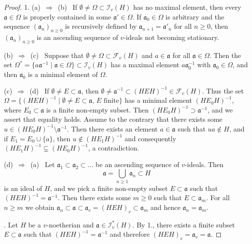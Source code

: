 \documentclass[a4paper]{amsart}
\theoremstyle{definition}
\numberwithin{equation}{section}
\begin{document}
\begin{proof}
1. (a)\, $\Rightarrow$\, (b) \ If $\emptyset \ne \Omega \subset
\mathcal I_v(H)$ has no maximal element, then every $\mathfrak a \in
\Omega$ is properly contained in some $\mathfrak a' \in \Omega$. If
$\mathfrak a_0 \in \Omega$ is arbitrary and the sequence $(\mathfrak
a_n)_{n \ge 0}$ is recursively defined by $\mathfrak a_{n+1} =
\mathfrak a'_n$ for all $n\ge 0$, then $(\mathfrak a_n)_{n\ge 0}$ is
an ascending sequence of $v$-ideals not becoming stationary.

\smallskip

(b)\, $\Rightarrow$\, (c) \ Suppose that $\emptyset \ne \Omega
\subset \mathcal F_v(H)$ and $a\in \mathfrak a$ for all $\mathfrak a
\in \Omega$. Then the set $\Omega^* = \{a \mathfrak a^{-1} \mid
\mathfrak a \in \Omega\} \subset \mathcal I_v(H)$ has a maximal
element $a \mathfrak a_0^{-1}$ with $\mathfrak a_0 \in \Omega$, and
then $\mathfrak a_0$ is a minimal element of $\Omega$.

\smallskip

(c)\, $\Rightarrow$\, (d) \ If $\emptyset \ne E \subset \mathfrak
a$, then $\emptyset \ne \mathfrak a^{-1} \subset (HEH)^{-1} \in
\mathcal F_v(H)$. Thus the set $\Omega = \{(HEH)^{-1} \mid \emptyset
\ne E\subset \mathfrak a,\, E \text { finite}\}$ has a minimal
element $(HE_0H)^{-1}$, where $E_0 \subset \mathfrak a$ is a finite
non-empty subset. Then $(HE_0H)^{-1} \supset \mathfrak a^{-1}$, and
we assert that equality holds. Assume to the contrary that there
exists some $u\in (HE_0H)^{-1} \setminus \mathfrak a^{-1}$. Then
there exists an element $a\in \mathfrak a$ such that $ua\notin H$,
and if $E_1 = E_0 \cup \{a\}$, then $u \notin (HE_1H)^{-1}$ and
consequently $(HE_1H)^{-1} \subsetneq (HE_0H)^{-1}$, a
contradiction.

\smallskip

(d)\, $\Rightarrow$\, (a) \ Let $\mathfrak a_1 \subset \mathfrak
a_2\subset \dots$ be an ascending sequence of $v$-ideals. Then
\[
\mathfrak a  = \bigcup_{n\ge 1}\mathfrak a_n \subset H
\]
is an ideal of $H$, and we pick a finite non-empty subset $E \subset
\mathfrak a$  such that $(HEH)^{-1} = \mathfrak a^{-1}$. Then there
exists some $m\ge 0$ such that $E \subset \mathfrak a_m$. For all $n
\ge m$ we obtain $\mathfrak a_n \subset \mathfrak a \subset
\mathfrak a_v = (HEH)_v \subset \mathfrak a _m $ and hence
$\mathfrak a_n = \mathfrak a_m$.

. Let $H$ be a $v$-noetherian and $\mathfrak a \in \mathcal I_v^* (H)$. By 1., there exists a
finite subset $E \subset \mathfrak a$ such that $(HEH)^{-1} =
\mathfrak a^{-1}$ and therefore $(HEH)_v = \mathfrak a_v = \mathfrak
a$.


\end{proof}
\end{document}
